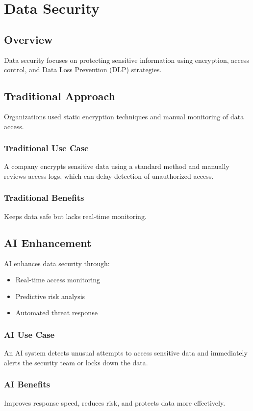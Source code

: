 \documentclass[10pt,a4paper]{article}
\begin{document}
\section{Data Security}
\subsection{Overview}
Data security focuses on protecting sensitive information using encryption, access control, and Data Loss Prevention (DLP) strategies.

\subsection{Traditional Approach}
Organizations used static encryption techniques and manual monitoring of data access.

\subsubsection{Traditional Use Case}
A company encrypts sensitive data using a standard method and manually reviews access logs, which can delay detection of unauthorized access.

\subsubsection{Traditional Benefits}
Keeps data safe but lacks real-time monitoring.

\subsection{AI Enhancement}
AI enhances data security through:
\begin{itemize}\itemsep0.5em
    \item Real-time access monitoring
    \item Predictive risk analysis
    \item Automated threat response
\end{itemize}

\subsubsection{AI Use Case}
An AI system detects unusual attempts to access sensitive data and immediately alerts the security team or locks down the data.

\subsubsection{AI Benefits}
Improves response speed, reduces risk, and protects data more effectively.
\end{document}
